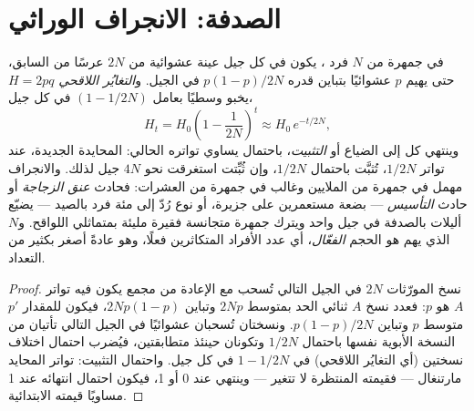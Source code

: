 \section{الصدفة: الانجراف الوراثي}

\begin{theorem}\label{thm:b2:population-genetics:drift}
في جمهرة من $N$ فرد ، يكون  في كل
جيل عينة عشوائية من $2N$ عرسًا من
السابق، حتى يهيم $p$ عشوائيًا بتباين قدره
$p(1 - p)/2N$ في الجيل. و\emph{التغايُر اللاقحي} $H = 2pq$
يخبو وسطيًا بعامل $(1 - 1/2N)$ في كل جيل،
\[
H_t = H_0\left(1 - \frac{1}{2N}\right)^{t} \approx H_0\,e^{-t/2N},
\]
وينتهي كل  إلى الضياع أو \emph{التثبيت}، باحتمال
يساوي تواتره الحالي:  المحايدة الجديدة،
عند تواتر $1/2N$، تُثبَّت باحتمال $1/2N$، وإن ثُبِّتت
استغرقت نحو $4N$ جيل لذلك. والانجراف مهمل في
جمهرة من الملايين وغالب في جمهرة من العشرات:
فحادث \emph{عنق الزجاجة} أو حادث \emph{التأسيس} --- بضعة مستعمرين على
جزيرة، أو نوع رُدّ إلى مئة فرد بالصيد --- يضيّع أليلات
بالصدفة في جيل واحد ويترك جمهرة متجانسة
فقيرة مليئة بمتماثلي اللواقح. و$N$ الذي يهم هو
الحجم \emph{الفعّال}، أي عدد الأفراد المتكاثرين فعلًا،
وهو عادةً أصغر بكثير من التعداد.
\end{theorem}
\begin{proof}
نسخ المورّثات $2N$ في الجيل التالي تُسحب مع الإعادة
من مجمع يكون فيه تواتر $A$ هو $p$: فعدد نسخ $A$
ثنائي الحد بمتوسط $2Np$ وتباين $2Np(1 - p)$، فيكون للمقدار $p'$
متوسط $p$ وتباين $p(1 - p)/2N$. ونسختان تُسحبان عشوائيًا في
الجيل التالي تأتيان من النسخة الأبوية نفسها باحتمال
$1/2N$ وتكونان حينئذ متطابقتين، فيُضرب احتمال اختلاف
نسختين (أي التغايُر اللاقحي) في $1 - 1/2N$ في كل
جيل. واحتمال التثبيت: تواتر  المحايد
مارتنغال --- فقيمته المنتظرة لا تتغير --- وينتهي عند 0
أو 1، فيكون احتمال انتهائه عند 1 مساويًا قيمته الابتدائية.
\end{proof}

